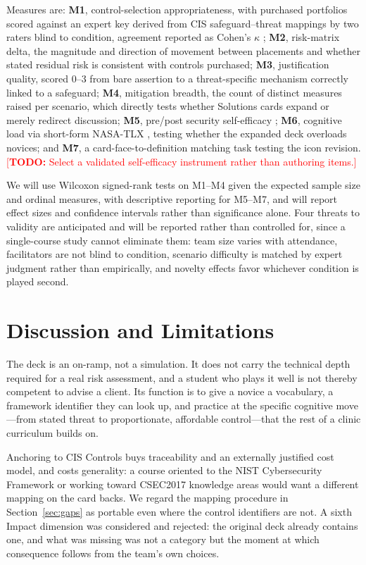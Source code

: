 \documentclass[10pt,twocolumn,letterpaper]{article}
\newcommand{\todo}[1]{\textcolor{red}{[\textbf{TODO:} #1]}}
\begin{document}
Measures are: \textbf{M1}, control-selection appropriateness, with purchased
portfolios scored against an expert key derived from CIS safeguard--threat
mappings by two raters blind to condition, agreement reported as Cohen's
$\kappa$ \cite{landis1977kappa}; \textbf{M2}, risk-matrix delta, the magnitude
and direction of movement between placements and whether stated residual risk is
consistent with controls purchased; \textbf{M3}, justification quality, scored
0--3 from bare assertion to a threat-specific mechanism correctly linked to a
safeguard; \textbf{M4}, mitigation breadth, the count of distinct measures
raised per scenario, which directly tests whether Solutions cards expand or
merely redirect discussion; \textbf{M5}, pre/post security self-efficacy
\cite{bandura1997selfefficacy}; \textbf{M6}, cognitive load via short-form
NASA-TLX \cite{hart1988nasatlx}, testing whether the expanded deck overloads
novices; and \textbf{M7}, a card-face-to-definition matching task testing the
icon revision.
\todo{Select a validated self-efficacy instrument rather than authoring items.}

We will use Wilcoxon signed-rank tests on M1--M4 given the expected sample size
and ordinal measures, with descriptive reporting for M5--M7, and will report
effect sizes and confidence intervals rather than significance alone. Four
threats to validity are anticipated and will be reported rather than controlled
for, since a single-course study cannot eliminate them: team size varies with
attendance, facilitators are not blind to condition, scenario difficulty is
matched by expert judgment rather than empirically, and novelty effects favor
whichever condition is played second.

\section{Discussion and Limitations}

The deck is an on-ramp, not a simulation. It does not carry the technical depth
required for a real risk assessment, and a student who plays it well is not
thereby competent to advise a client. Its function is to give a novice a
vocabulary, a framework identifier they can look up, and practice at the
specific cognitive move---from stated threat to proportionate, affordable
control---that the rest of a clinic curriculum builds on.

Anchoring to CIS Controls buys traceability and an externally justified cost
model, and costs generality: a course oriented to the NIST Cybersecurity
Framework \cite{nist_csf2} or working toward CSEC2017 knowledge areas
\cite{csec2017} would want a different mapping on the card backs. We regard the
mapping procedure in Section~\ref{sec:gaps} as portable even where the control
identifiers are not. A sixth Impact dimension was considered and
rejected: the original deck already contains one, and what was missing was not a
category but the moment at which consequence follows from the team's own
choices.
\end{document}

